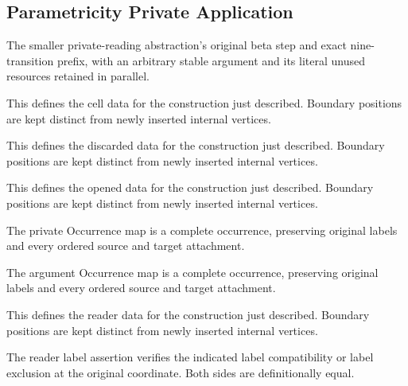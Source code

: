 \subsection{Parametricity Private Application}
The smaller private-reading abstraction's original beta step and exact nine-transition prefix, with an arbitrary stable argument and its literal unused resources retained in parallel.

This defines the cell data for the construction just described. Boundary positions are kept distinct from newly inserted internal vertices.
\par{}

This defines the discarded data for the construction just described. Boundary positions are kept distinct from newly inserted internal vertices.
\par{}

This defines the opened data for the construction just described. Boundary positions are kept distinct from newly inserted internal vertices.
\par{}

The private Occurrence map is a complete occurrence, preserving original labels and every ordered source and target attachment.
\par{}

The argument Occurrence map is a complete occurrence, preserving original labels and every ordered source and target attachment.
\par{}

This defines the reader data for the construction just described. Boundary positions are kept distinct from newly inserted internal vertices.
\par{}

The reader label assertion verifies the indicated label compatibility or label exclusion at the original coordinate.
Both sides are definitionally equal.
\par{}

